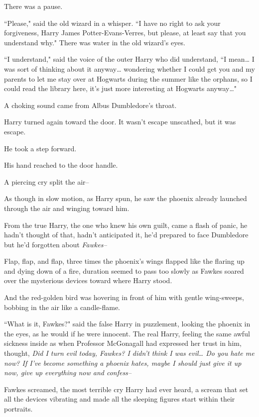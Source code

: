 There was a pause.

``Please," said the old wizard in a whisper. ``I have no right to ask your forgiveness, Harry James Potter-Evans-Verres, but please, at least say that you understand why." There was water in the old wizard's eyes.

``I understand," said the voice of the outer Harry who did understand, ``I mean{\ldots} I was sort of thinking about it anyway{\ldots} wondering whether I could get you and my parents to let me stay over at Hogwarts during the summer like the orphans, so I could read the library here, it's just more interesting at Hogwarts anyway{\ldots}"

A choking sound came from Albus Dumbledore's throat.

Harry turned again toward the door. It wasn't escape unscathed, but it was escape.

He took a step forward.

His hand reached to the door handle.

A piercing cry split the air\---

As though in slow motion, as Harry spun, he saw the phoenix already launched through the air and winging toward him.

From the true Harry, the one who knew his own guilt, came a flash of panic, he hadn't thought of that, hadn't anticipated it, he'd prepared to face Dumbledore but he'd forgotten about \emph{Fawkes\---}

Flap, flap, and flap, three times the phoenix's wings flapped like the flaring up and dying down of a fire, duration seemed to pass too slowly as Fawkes soared over the mysterious devices toward where Harry stood.

And the red-golden bird was hovering in front of him with gentle wing-sweeps, bobbing in the air like a candle-flame.

``What is it, Fawkes?" said the false Harry in puzzlement, looking the phoenix in the eyes, as he would if he were innocent. The real Harry, feeling the same awful sickness inside as when Professor McGonagall had expressed her trust in him, thought, \emph{Did I turn evil today, Fawkes? I didn't think I was evil{\ldots} Do you hate me now? If I've become something a phoenix hates, maybe I should just give it up now, give up everything now and confess\---}

Fawkes screamed, the most terrible cry Harry had ever heard, a scream that set all the devices vibrating and made all the sleeping figures start within their portraits.


